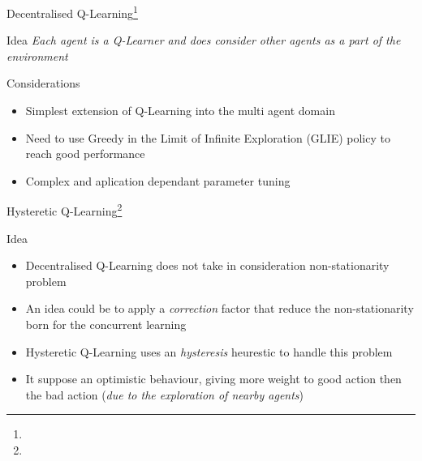 \documentclass[presentation]{beamer}\mode<presentation>{\usetheme{AMSBolognaFC}}
\begin{document}
\begin{frame}{Decentralised Q-Learning\footnote{}}
	\begin{exampleblock}{Idea}
		\emph{Each agent is a Q-Learner and does consider other agents as a part of the environment}
	\end{exampleblock}

	\begin{exampleblock}{Considerations}
		\begin{itemize}
			\item[{\color{teal} \faThumbsUp}] Simplest extension of Q-Learning into the multi agent domain
			\item[{\color{red} \faThumbsDown}] Need to use Greedy in the Limit of Infinite Exploration (GLIE) policy to reach good performance
			\item[{\color{red} \faThumbsDown}] Complex and aplication dependant parameter tuning
		\end{itemize}
	\end{exampleblock}
\end{frame}

\begin{frame}{Hysteretic Q-Learning\footnote[frame]{}}
	\begin{alertblock}{Idea}
		\begin{itemize}
			\item Decentralised Q-Learning does not take in consideration non-stationarity problem
			\item An idea could be to apply a \emph{correction} factor that reduce the non-stationarity born for the concurrent learning
			\item Hysteretic Q-Learning uses an \emph{hysteresis} heurestic to handle this problem
			\item It suppose an optimistic behaviour, giving more weight to good action then the bad action (\emph{due to the exploration of nearby agents})
		\end{itemize}
	\end{alertblock}
\end{frame}
\end{document}
